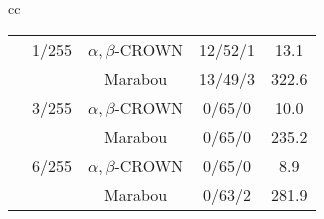 \begin{table*}[htbp]
\begin{tabular}{cc}
\begin{minipage}{0.48\linewidth}
\begin{tabular}{|c|c|c|c|c|}
\cline{2-5}
 & 1/255 & $\alpha, \beta$-CROWN & 12/52/1 & 13.1 \\
 &  & Marabou & 13/49/3 & 322.6 \\
\cline{2-5}
 & 3/255 & $\alpha, \beta$-CROWN & 0/65/0 & 10.0 \\
 &  & Marabou & 0/65/0 & 235.2 \\
\cline{2-5}
 & 6/255 & $\alpha, \beta$-CROWN & 0/65/0 & 8.9 \\
 &  & Marabou & 0/63/2 & 281.9 \\
\cline{2-5}
\hline
\end{tabular}

\end{minipage} \\\\
\end{tabular}
\label{tab:verification_by_model}
\end{table*}